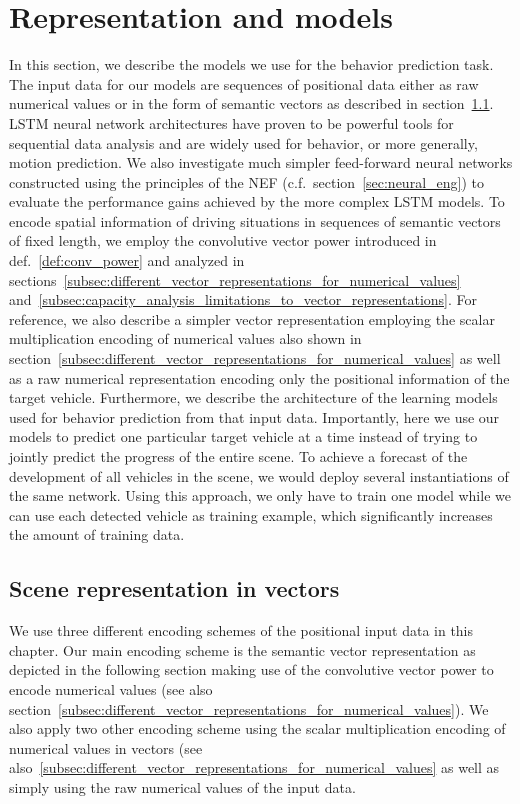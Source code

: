 \section{Representation and models}
\label{sec:repr_models}

In this section, we describe the models we use for the behavior prediction task.
The input data for our models are sequences of positional data either as raw numerical values or in the form of semantic vectors as described in section~\ref{subsec:scene_representation_in_vectors}.
\ac{LSTM} neural network architectures have proven to be powerful tools for sequential data analysis and are widely used for behavior, or more generally, motion prediction.
We also investigate much simpler feed-forward neural networks constructed using the principles of the \acl{NEF} (c.f.\ section~\ref{sec:neural_eng}) to evaluate the performance gains achieved by the more complex \ac{LSTM} models.
To encode spatial information of driving situations in sequences of semantic vectors of fixed length, we employ the convolutive vector power introduced in def.~\ref{def:conv_power} and analyzed in sections~\ref{subsec:different_vector_representations_for_numerical_values} and~\ref{subsec:capacity_analysis_limitations_to_vector_representations}.
For reference, we also describe a simpler vector representation employing the scalar multiplication encoding of numerical values also shown in section~\ref{subsec:different_vector_representations_for_numerical_values} as well as a raw numerical representation encoding only the positional information of the target vehicle.  
Furthermore, we describe the architecture of the learning models used for behavior prediction from that input data.
Importantly, here we use our models to predict one particular target vehicle at a time instead of trying to jointly predict the progress of the entire scene.
To achieve a forecast of the development of all vehicles in the scene, we would deploy several instantiations of the same network.
Using this approach, we only have to train one model while we can use each detected vehicle as training example, which significantly increases the amount of training data. 

\subsection{Scene representation in vectors}%
\label{subsec:scene_representation_in_vectors}

We use three different encoding schemes of the positional input data in this chapter.
Our main encoding scheme is the semantic vector representation as depicted in the following section making use of the convolutive vector power to encode numerical values (see also section~\ref{subsec:different_vector_representations_for_numerical_values}).
We also apply two other encoding scheme using the scalar multiplication encoding of numerical values in vectors (see also~\ref{subsec:different_vector_representations_for_numerical_values} as well as simply using the raw numerical values of the input data.


